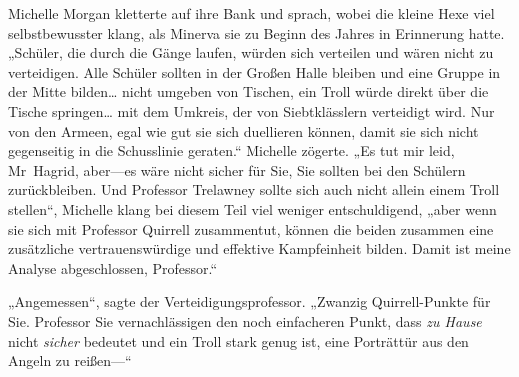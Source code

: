 Michelle Morgan kletterte auf ihre Bank und sprach, wobei die kleine Hexe viel selbstbewusster klang, als Minerva sie zu Beginn des Jahres in Erinnerung hatte. „Schüler, die durch die Gänge laufen, würden sich verteilen und wären nicht zu verteidigen. Alle Schüler sollten in der Großen Halle bleiben und eine Gruppe in der Mitte bilden… nicht umgeben von Tischen, ein Troll würde direkt über die Tische springen… mit dem Umkreis, der von Siebtklässlern verteidigt wird. Nur von den Armeen, egal wie gut sie sich duellieren können, damit sie sich nicht gegenseitig in die Schusslinie geraten.“ Michelle zögerte. „Es tut mir leid, Mr~Hagrid, aber—es wäre nicht sicher für Sie, Sie sollten bei den Schülern zurückbleiben. Und Professor Trelawney sollte sich auch nicht allein einem Troll stellen“, Michelle klang bei diesem Teil viel weniger entschuldigend, „aber wenn sie sich mit Professor Quirrell zusammentut, können die beiden zusammen eine zusätzliche vertrauenswürdige und effektive Kampfeinheit bilden. Damit ist meine Analyse abgeschlossen, Professor.“

„Angemessen“, sagte der Verteidigungsprofessor. „Zwanzig Quirrell-Punkte für Sie. Professor Sie vernachlässigen den noch einfacheren Punkt, dass \emph{zu Hause} nicht \emph{sicher} bedeutet und ein Troll stark genug ist, eine Porträttür aus den Angeln zu reißen—“

